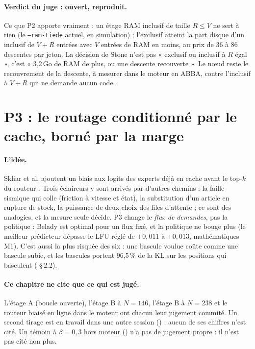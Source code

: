 \paragraph{Verdict du juge : ouvert, reproduit.} Ce que P2 apporte vraiment : un étage RAM inclusif de taille $R \le V$ ne sert à rien (le \texttt{--ram-tiede} actuel, en simulation) ; l'exclusif atteint la part disque d'un inclusif de $V+R$ entrées avec $V$ entrées de RAM en moins, au prix de 36 à 86 descentes par jeton. La décision de Stone n'est pas « exclusif ou inclusif à $R$ égal », c'est « 3,2\,Go de RAM de plus, ou une descente recouverte ». Le nœud reste le recouvrement de la descente, à mesurer dans le moteur en ABBA, contre l'inclusif à $V+R$ qui ne demande aucun code.

\section{P3 : le routage conditionné par le cache, borné par la marge}\label{t3mim:sec:p3}

\paragraph{L'idée.} Skliar et al. ajoutent un biais aux logits des experts déjà en cache avant le top-$k$ du routeur \cite{skliar2025cacheconditional}. Trois éclaireurs y sont arrivés par d'autres chemins : la faille sismique qui colle (friction à vitesse et état), la substitution d'un article en rupture de stock, la puissance de deux choix des files d'attente ; ce sont des analogies, et la mesure seule décide. P3 change le \emph{flux de demandes}, pas la politique : Belady est optimal pour un flux fixé, et la politique ne bouge plus (le meilleur prédicteur dépasse le LFU réglé de $+0{,}011$ à $+0{,}013$, mathématiques M1). C'est aussi la plus risquée des six : une bascule voulue coûte comme une bascule subie, et les bascules portent 96,5\,\% de la KL sur les positions qui basculent ( §\,2.2).

\paragraph{Ce chapitre ne cite que ce qui est jugé.} L'étage A (boucle ouverte), l'étage B à $N = 146$, l'étage B à $N = 238$ et le routeur biaisé en ligne dans le moteur ont chacun leur jugement commité. Un second tirage est en travail dans une autre session () : aucun de ses chiffres n'est cité. Un témoin à $\beta = 0{,}3$ hors moteur () n'a pas de jugement propre : il n'est pas cité non plus.

